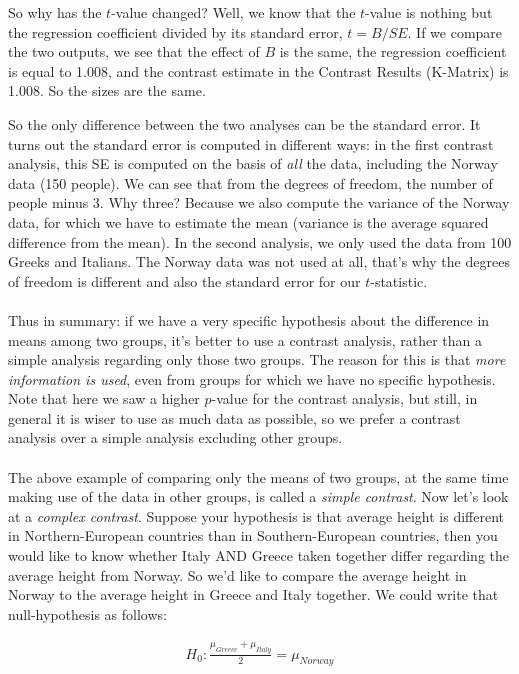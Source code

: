 \documentclass[]{report}\usepackage[]{graphicx}\usepackage[]{color}
\begin{document}
So why has the $t$-value changed? Well, we know that the $t$-value is nothing but the regression coefficient divided by its standard error, $t=B/{SE}$. If we compare the two outputs, we see that the effect of $B$ is the same, the regression coefficient is equal to 1.008, and the contrast estimate in the Contrast Results (K-Matrix) is 1.008. So the sizes are the same. 

So the only difference between the two analyses can be the standard error. It turns out the standard error is computed in different ways: in the first contrast analysis, this SE is computed on the basis of \textit{all} the data, including the Norway data (150 people). We can see that from the degrees of freedom, the number of people minus 3. Why three? Because we also compute the variance of the Norway data, for which we have to estimate the mean (variance is the average squared difference from the mean). In the second analysis, we only used the data from 100 Greeks and Italians. The Norway data was not used at all, that's why the degrees of freedom is different and also the standard error for our $t$-statistic. 
\\
\\
Thus in summary: if we have a very specific hypothesis about the difference in means among two groups, it's better to use a contrast analysis, rather than a simple analysis regarding only those two groups. The reason for this is that \textit{more information is used}, even from groups for which we have no specific hypothesis. 
\\
Note that here we saw a higher $p$-value for the contrast analysis, but still, in general it is wiser to use as much data as possible, so we prefer a contrast analysis over a simple analysis excluding other groups.
\\
\\
The above example of comparing only the means of two groups, at the same time making use of the data in other groups, is called a \textit{simple contrast}. Now let's look at a \textit{complex contrast}. Suppose your hypothesis is that average height is different in Northern-European countries than in Southern-European countries, then you would like to know whether Italy AND Greece taken together differ regarding the average height from Norway. So we'd like to compare the average height in Norway to the average height in Greece and Italy together. We could write that null-hypothesis as follows:

\begin{eqnarray}
H_0 : \frac{\mu_{Greece}+ \mu_{Italy}}{2} = \mu_{Norway}
\end{eqnarray}
\end{document}
